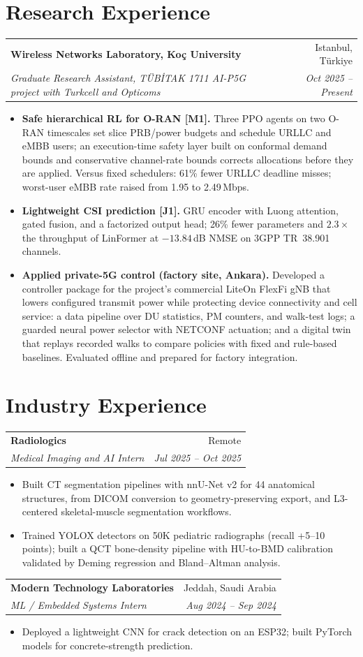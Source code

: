 \documentclass[10pt,a4paper]{article}
\makeatletter
\newcommand{\entry}[4]{%
  \noindent\begin{tabular*}{\linewidth}{@{}l@{\extracolsep{\fill}}r@{}}
    \textbf{#1} & #2 \\
    \textit{#3} & \textit{#4}
  \end{tabular*}\par}
\makeatother
\begin{document}
\section{Research Experience}
\entry{Wireless Networks Laboratory, Koç University}{Istanbul, Türkiye}
      {Graduate Research Assistant, TÜBİTAK 1711 AI-P5G project with Turkcell and Opticoms}{Oct 2025 -- Present}
\begin{itemize}
  \item \textbf{Safe hierarchical RL for O-RAN [M1].} Three PPO agents on two O-RAN timescales set slice PRB/power budgets
        and schedule URLLC and eMBB users; an execution-time safety layer built on conformal demand bounds and conservative
        channel-rate bounds corrects allocations before they are applied. Versus fixed schedulers: 61\% fewer URLLC deadline
        misses; worst-user eMBB rate raised from 1.95 to 2.49\,Mbps.
  \item \textbf{Lightweight CSI prediction [J1].} GRU encoder with Luong attention, gated fusion, and a factorized output head;
        26\% fewer parameters and $2.3\times$ the throughput of LinFormer at $-13.84$\,dB NMSE on
        3GPP TR~38.901 channels.
  \item \textbf{Applied private-5G control (factory site, Ankara).} Developed a controller package for the project's commercial
        LiteOn FlexFi gNB that lowers configured transmit power while protecting device connectivity and cell service: a data
        pipeline over DU statistics, PM counters, and walk-test logs; a guarded neural power selector with NETCONF actuation;
        and a digital twin that replays recorded walks to compare policies with fixed and rule-based baselines.
        Evaluated offline and prepared for factory integration.
\end{itemize}

\section{Industry Experience}
\entry{Radiologics}{Remote}{Medical Imaging and AI Intern}{Jul 2025 -- Oct 2025}
\begin{itemize}
  \item Built CT segmentation pipelines with nnU-Net v2 for 44 anatomical structures, from DICOM conversion to
        geometry-preserving export, and L3-centered skeletal-muscle segmentation workflows.
  \item Trained YOLOX detectors on 50K pediatric radiographs (recall +5--10 points); built a QCT bone-density pipeline with
        HU-to-BMD calibration validated by Deming regression and Bland--Altman analysis.
\end{itemize}
\vspace{3pt}
\entry{Modern Technology Laboratories}{Jeddah, Saudi Arabia}{ML / Embedded Systems Intern}{Aug 2024 -- Sep 2024}
\begin{itemize}
  \item Deployed a lightweight CNN for crack detection on an ESP32; built PyTorch models for concrete-strength prediction.
\end{itemize}
\end{document}

